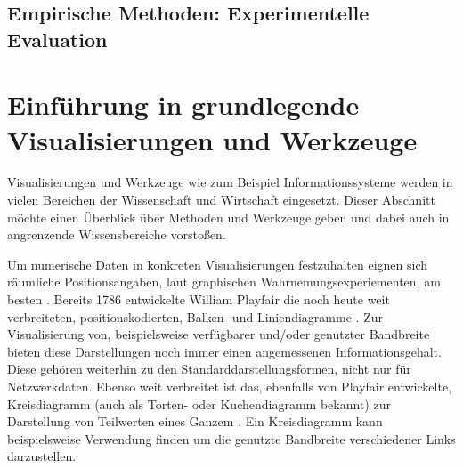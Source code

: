 \documentclass[draft=false
              ,paper=a4
              ,twoside=false
              ,fontsize=11pt
              ,headsepline
              ,BCOR10mm
              ,DIV11
              ]{scrbook}
\begin{document}

\subsection{Empirische Methoden: Experimentelle Evaluation} %
\label{sub:empirische_methoden_experimentelle_evaluation}


\section{Einführung in grundlegende Visualisierungen und Werkzeuge} %
\label{sec:visualisierungen_und_werkzeuge}

Visualisierungen und Werkzeuge wie zum Beispiel Informationssysteme werden in vielen Bereichen der Wissenschaft und Wirtschaft eingesetzt. Dieser Abschnitt möchte einen Überblick über Methoden und Werkzeuge geben und dabei auch in angrenzende Wissensbereiche vorstoßen. 

Um numerische Daten in konkreten Visualisierungen festzuhalten eignen sich räumliche Positionsangaben, laut graphischen Wahrnemungsexperiementen, am besten \cite{heer_tour_2010}. Bereits 1786 entwickelte William Playfair die noch heute weit verbreiteten, positionskodierten, Balken- und Liniendiagramme \cite{playfair_playfairs_1768}. Zur Visualisierung von, beispielsweise verfügbarer und/oder genutzter Bandbreite bieten diese Darstellungen noch immer einen angemessenen Informationsgehalt. Diese gehören weiterhin zu den Standarddarstellungsformen, nicht nur für Netzwerkdaten. Ebenso weit verbreitet ist das, ebenfalls von Playfair entwickelte, Kreisdiagramm (auch als Torten- oder Kuchendiagramm bekannt) zur Darstellung von Teilwerten eines Ganzem \cite{playfair_statistical_1801}. Ein Kreisdiagramm kann beispielsweise Verwendung finden um die genutzte Bandbreite verschiedener Links darzustellen. 
\end{document}
